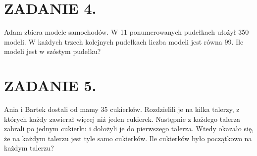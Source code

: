\documentclass[10pt]{article}
\begin{document}
\section*{ZADANIE 4.}
Adam zbiera modele samochodów. W 11 ponumerowanych pudełkach ułożył 350 modeli. W każdych trzech kolejnych pudełkach liczba modeli jest równa 99. Ile modeli jest w szóstym pudełku?

\section*{ZADANIE 5.}
Ania i Bartek dostali od mamy 35 cukierków. Rozdzielili je na kilka talerzy, z których każdy zawierał więcej niż jeden cukierek. Następnie z każdego talerza zabrali po jednym cukierku i dołożyli je do pierwszego talerza. Wtedy okazało się, że na każdym talerzu jest tyle samo cukierków. Ile cukierków było początkowo na każdym talerzu?
\end{document}
